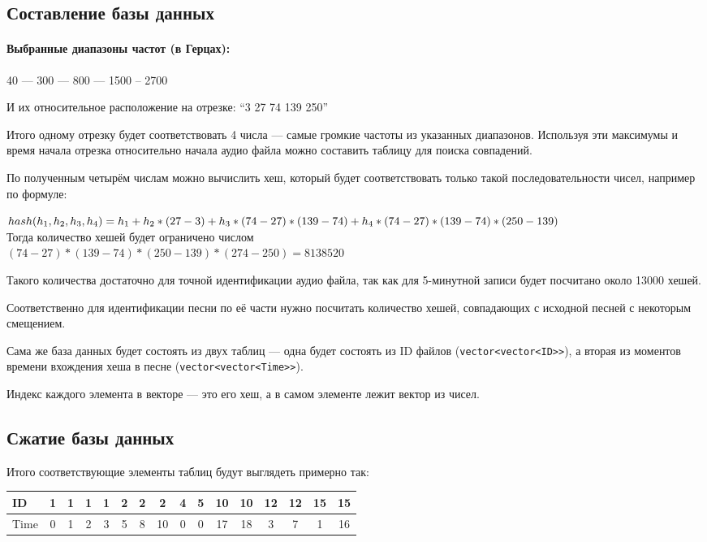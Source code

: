\documentclass[12pt]{article}
\begin{document}
\subsection*{Составление базы данных}

\paragraph*{Выбранные диапазоны частот (в Герцах):}
40 --- 300 --- 800 --- 1500 -- 2700

И их относительное расположение на отрезке: ``3 27 74 139 250''

Итого одному отрезку будет соответствовать 4 числа --- самые громкие частоты из указанных
диапазонов. Используя эти максимумы и время начала отрезка относительно начала аудио файла
можно составить таблицу для поиска совпадений.

По полученным четырём числам можно вычислить хеш, который будет соответствовать только
такой последовательности чисел, например по формуле:

$hash(h_1,h_2,h_3,h_4) = h_1 + h_2 * (27 - 3)\\
	+h_3 * (74 -27)*(139-74)\\+h_4 * (74 -27)*(139-74)*(250 - 139)$\\
Тогда количество хешей будет ограничено числом\\
$(74 -27)*(139-74)*(250 - 139)*(274-250) = 8138520$

Такого количества достаточно для точной идентификации аудио файла, так как для 5-минутной
записи будет посчитано около 13000 хешей.

Соответственно для идентификации песни по её части нужно посчитать количество хешей,
совпадающих с исходной песней с некоторым смещением.

Сама же база данных будет состоять из двух таблиц --- одна будет состоять из ID файлов
(\lstinline{vector<vector<ID>>}),
а вторая из моментов времени вхождения хеша в песне (\lstinline{vector<vector<Time>>}).

Индекс каждого элемента в векторе --- это его хеш, а в самом элементе лежит вектор из
чисел.


\subsection*{Сжатие базы данных}
Итого соответствующие элементы таблиц будут выглядеть примерно так:
\begin{table}[ht!]
	\begin{tabular}{|l|c|c|c|c|c|c|c|c|c|c|c|c|c|c|c|}
		\hline
		ID   & 1 & 1 & 1 & 1 & 2 & 2 & 2  & 4 & 5 & 10 & 10 & 12 & 12 & 15 & 15 \\ \hline
		Time & 0 & 1 & 2 & 3 & 5 & 8 & 10 & 0 & 0 & 17 & 18 & 3  & 7  & 1  & 16 \\ \hline
	\end{tabular}
\end{table}
\end{document}
